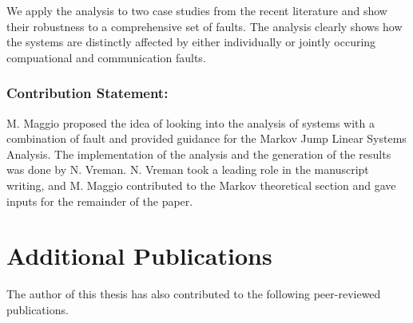 We apply the analysis to two case studies from the recent literature and show their robustness to a comprehensive set of faults.
The analysis clearly shows how the systems are distinctly affected by either individually or jointly occuring compuational and communication faults.


\subsubsection*{Contribution Statement:}%
%
M. Maggio proposed the idea of looking into the analysis of systems with a combination of fault and provided guidance for the Markov Jump Linear Systems Analysis.
The implementation of the analysis and the generation of the results was done by N. Vreman.
N. Vreman took a leading role in the manuscript writing, and M. Maggio contributed to the Markov theoretical section and gave inputs for the remainder of the paper.


\section{Additional Publications}%
\label{sec:additional-publications}%
%
The author of this thesis has also contributed to the following peer-reviewed publications.

\begin{quote}
\end{quote}

\begin{quote}
\end{quote}

\begin{quote}
\end{quote}

\begin{quote}
\end{quote}

\begin{quote}
\end{quote}

\begin{quote}
\end{quote}
